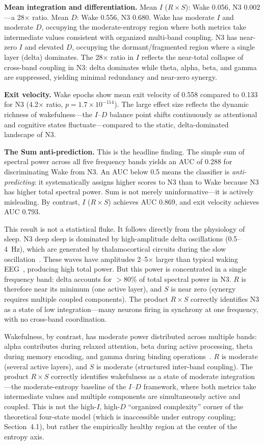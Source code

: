 \documentclass[aip,cha,reprint,amsmath,amssymb,final]{revtex4-2}
\begin{document}
\textbf{Mean integration and differentiation.} Mean $I$ ($R \times S$): Wake 0.056, N3 0.002---a 28$\times$ ratio. Mean $D$: Wake 0.556, N3 0.680. Wake has moderate $I$ and moderate $D$, occupying the moderate-entropy region where both metrics take intermediate values consistent with organized multi-band coupling. N3 has near-zero $I$ and elevated $D$, occupying the dormant/fragmented region where a single layer (delta) dominates. The 28$\times$ ratio in $I$ reflects the near-total collapse of cross-band coupling in N3: delta dominates while theta, alpha, beta, and gamma are suppressed, yielding minimal redundancy and near-zero synergy.

\textbf{Exit velocity.} Wake epochs show mean exit velocity of 0.558 compared to 0.133 for N3 (4.2$\times$ ratio, $p = 1.7 \times 10^{-114}$). The large effect size reflects the dynamic richness of wakefulness---the $I$--$D$ balance point shifts continuously as attentional and cognitive states fluctuate---compared to the static, delta-dominated landscape of N3.

\textbf{The Sum anti-prediction.} This is the headline finding. The simple sum of spectral power across all five frequency bands yields an AUC of 0.288 for discriminating Wake from N3. An AUC below 0.5 means the classifier is \emph{anti-predicting}: it systematically assigns higher scores to N3 than to Wake because N3 has higher total spectral power. Sum is not merely uninformative---it is actively misleading. By contrast, $I$ ($R \times S$) achieves AUC 0.869, and exit velocity achieves AUC 0.793.

This result is not a statistical fluke. It follows directly from the physiology of sleep. N3 deep sleep is dominated by high-amplitude delta oscillations (0.5--4~Hz), which are generated by thalamocortical circuits during the slow oscillation~\cite{massimini2005}. These waves have amplitudes 2--5$\times$ larger than typical waking EEG~\cite{niedermeyer2005}, producing high total power. But this power is concentrated in a single frequency band: delta accounts for $>$80\% of total spectral power in N3. $R$ is therefore near its minimum (one active layer), and $S$ is near zero (synergy requires multiple coupled components). The product $R \times S$ correctly identifies N3 as a state of low integration---many neurons firing in synchrony at one frequency, with no cross-band coordination.

Wakefulness, by contrast, has moderate power distributed across multiple bands: alpha contributes during relaxed attention, beta during active processing, theta during memory encoding, and gamma during binding operations~\cite{buzsaki2006}. $R$ is moderate (several active layers), and $S$ is moderate (structured inter-band coupling). The product $R \times S$ correctly identifies wakefulness as a state of moderate integration---the moderate-entropy baseline of the $I$--$D$ framework, where both metrics take intermediate values and multiple components are simultaneously active and coupled. This is not the high-$I$, high-$D$ ``organized complexity'' corner of the theoretical four-state model (which is inaccessible under entropy coupling; Section~4.1), but rather the empirically healthy region at the center of the entropy axis.
\end{document}
